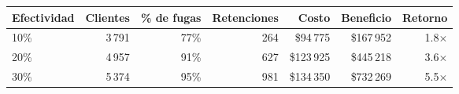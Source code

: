 \begin{tabular}{@{}lrrrrrr@{}}
\toprule
\textbf{Efectividad} & \textbf{Clientes} & \textbf{\% de fugas} & \textbf{Retenciones} & \textbf{Costo} & \textbf{Beneficio} & \textbf{Retorno} \\
\midrule
10\% & 3\,791 & 77\% & 264 & \$94\,775 & \$167\,952 & 1.8$\times$ \\
20\% & 4\,957 & 91\% & 627 & \$123\,925 & \$445\,218 & 3.6$\times$ \\
30\% & 5\,374 & 95\% & 981 & \$134\,350 & \$732\,269 & 5.5$\times$ \\
\bottomrule
\end{tabular}